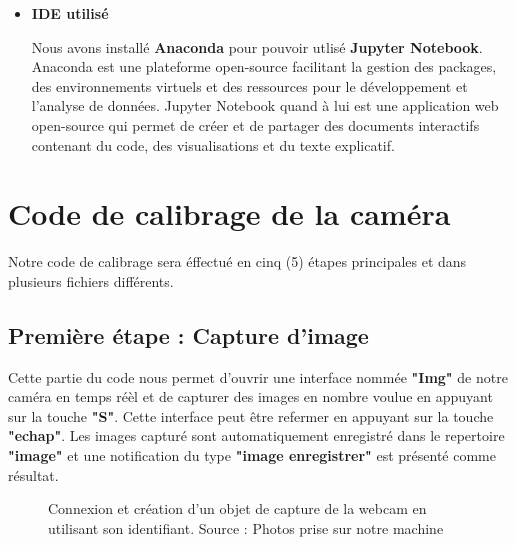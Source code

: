 \begin{itemize}[label={\Huge$\star$}]
 \item \textbf{IDE utilisé}	
  			
  			Nous avons installé \textbf{Anaconda}  pour pouvoir utlisé \textbf{Jupyter Notebook}. Anaconda est une plateforme open-source facilitant la gestion des packages, des environnements virtuels et des ressources pour le développement et l'analyse de données.
  			Jupyter Notebook quand à lui est une application web open-source qui permet de créer et de partager des documents interactifs contenant du code, des visualisations et du texte explicatif.
\end{itemize}
 
 
 
\section{Code de calibrage de la caméra}
 Notre code de calibrage sera éffectué en cinq (5) étapes principales et dans plusieurs fichiers différents.
 
  \subsection{Première étape : Capture d'image}
 		
 	Cette partie du code nous permet d'ouvrir une interface nommée \textbf{"Img"} de notre caméra en temps réèl et de capturer des images en nombre voulue en appuyant sur la touche \textbf{"S"}. Cette interface peut être refermer en appuyant sur la touche \textbf{"echap"}. Les images capturé sont automatiquement enregistré dans le repertoire \textbf{"image"} et une notification du type \textbf{"image enregistrer"} est présenté comme résultat.
 	
 	\begin{figure}[H]%
 		\center%
 		\setlength{\fboxsep}{5pt}%
 		\setlength{\fboxrule}{0.5pt}%
 		\caption[Code de capture d'image (partie 1)]{Connexion et création d'un objet de capture de la webcam en utilisant son identifiant. Source : Photos prise sur notre machine}%
 		\label{fig:Code de capture d'image(partie 1)}
 	\end{figure}
 	
